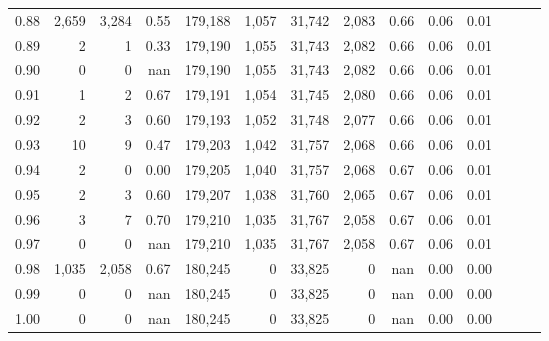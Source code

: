 \begin{tabular}{rrrrrrrrrrrrrr}
0.88 &   2,659 &  3,284 &  0.55 &  179,188 &    1,057 &  31,742 &   2,083 &  0.66 &  0.06 &      0.01 \\
0.89 &       2 &      1 &  0.33 &  179,190 &    1,055 &  31,743 &   2,082 &  0.66 &  0.06 &      0.01 \\
0.90 &       0 &      0 &   nan &  179,190 &    1,055 &  31,743 &   2,082 &  0.66 &  0.06 &      0.01 \\
0.91 &       1 &      2 &  0.67 &  179,191 &    1,054 &  31,745 &   2,080 &  0.66 &  0.06 &      0.01 \\
0.92 &       2 &      3 &  0.60 &  179,193 &    1,052 &  31,748 &   2,077 &  0.66 &  0.06 &      0.01 \\
0.93 &      10 &      9 &  0.47 &  179,203 &    1,042 &  31,757 &   2,068 &  0.66 &  0.06 &      0.01 \\
0.94 &       2 &      0 &  0.00 &  179,205 &    1,040 &  31,757 &   2,068 &  0.67 &  0.06 &      0.01 \\
0.95 &       2 &      3 &  0.60 &  179,207 &    1,038 &  31,760 &   2,065 &  0.67 &  0.06 &      0.01 \\
0.96 &       3 &      7 &  0.70 &  179,210 &    1,035 &  31,767 &   2,058 &  0.67 &  0.06 &      0.01 \\
0.97 &       0 &      0 &   nan &  179,210 &    1,035 &  31,767 &   2,058 &  0.67 &  0.06 &      0.01 \\
0.98 &   1,035 &  2,058 &  0.67 &  180,245 &        0 &  33,825 &       0 &   nan &  0.00 &      0.00 \\
0.99 &       0 &      0 &   nan &  180,245 &        0 &  33,825 &       0 &   nan &  0.00 &      0.00 \\
1.00 &       0 &      0 &   nan &  180,245 &        0 &  33,825 &       0 &   nan &  0.00 &      0.00 \\
\bottomrule
\end{tabular}
